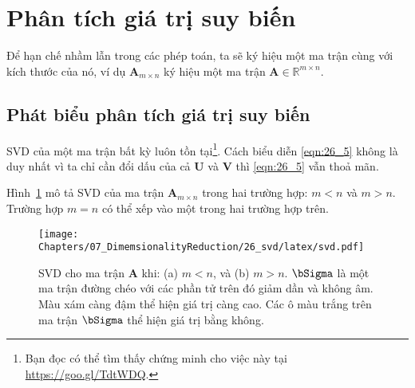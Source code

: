  
 
\section{Phân tích giá trị suy biến}
Để hạn chế nhầm lẫn trong các phép toán, ta sẽ ký hiệu một ma trận cùng với kích thước của nó, ví dụ $\mathbf{A}_{m \times n}$ ký hiệu một ma trận
$\mathbf{A} \in \mathbb{R}^{m \times n}$.
 
\subsection{Phát biểu phân tích giá trị suy biến}
{}

 
SVD của một ma trận bất kỳ luôn tồn tại\footnote{Bạn đọc có thể tìm thấy chứng
minh cho việc này tại \url{https://goo.gl/TdtWDQ}.}. Cách biểu diễn
\eqref{eqn:26_5} không là duy nhất vì ta chỉ cần đổi dấu của cả $\mathbf{U}$ và
$\mathbf{V}$ thì \eqref{eqn:26_5} vẫn thoả mãn.
 
Hình~\ref{fig:26_1} mô tả SVD của ma trận $\mathbf{A}_{m \times n}$ trong hai
trường hợp: $m < n$ và $m > n$. Trường hợp $m =n$ có thể xếp vào một trong hai
trường hợp trên.

\begin{figure}[t]
\centering
    \texttt{[image: Chapters/07\_DimemsionalityReduction/26\_svd/latex/svd.pdf]}
    \caption[]{SVD cho ma trận $\mathbf{A}$ khi: (a) $m < n$, và (b) $m > n$. $\bSigma$ là một ma trận đường chéo với các phần tử trên đó
    giảm dần và không âm. Màu xám càng đậm thể hiện giá trị càng cao. Các ô màu
    trắng trên ma trận $\bSigma$ thể hiện giá trị bằng không.}
    \label{fig:26_1}
\end{figure}
